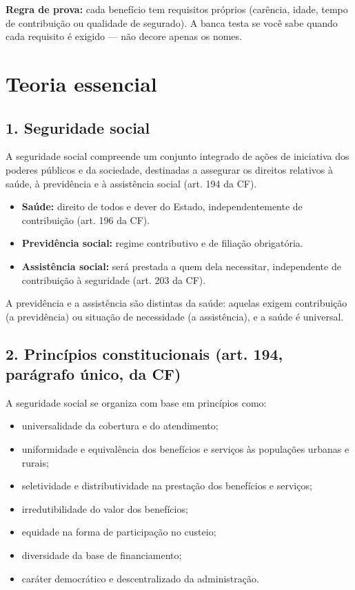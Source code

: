 \documentclass[11pt,a4paper]{article}
\begin{document}
\textbf{Regra de prova:} cada benefício tem requisitos próprios (carência, idade, tempo de contribuição ou qualidade de segurado). A banca testa se você sabe quando cada requisito é exigido — não decore apenas os nomes.

\section*{Teoria essencial}

\subsection*{1. Seguridade social}

A seguridade social compreende um conjunto integrado de ações de iniciativa dos poderes públicos e da sociedade, destinadas a assegurar os direitos relativos à saúde, à previdência e à assistência social (art. 194 da CF).

\begin{itemize}
  \item \textbf{Saúde:} direito de todos e dever do Estado, independentemente de contribuição (art. 196 da CF).
  \item \textbf{Previdência social:} regime contributivo e de filiação obrigatória.
  \item \textbf{Assistência social:} será prestada a quem dela necessitar, independente de contribuição à seguridade (art. 203 da CF).
\end{itemize}

A previdência e a assistência são distintas da saúde: aquelas exigem contribuição (a previdência) ou situação de necessidade (a assistência), e a saúde é universal.

\subsection*{2. Princípios constitucionais (art. 194, parágrafo único, da CF)}

A seguridade social se organiza com base em princípios como:

\begin{itemize}
  \item universalidade da cobertura e do atendimento;
  \item uniformidade e equivalência dos benefícios e serviços às populações urbanas e rurais;
  \item seletividade e distributividade na prestação dos benefícios e serviços;
  \item irredutibilidade do valor dos benefícios;
  \item equidade na forma de participação no custeio;
  \item diversidade da base de financiamento;
  \item caráter democrático e descentralizado da administração.
\end{itemize}
\end{document}
